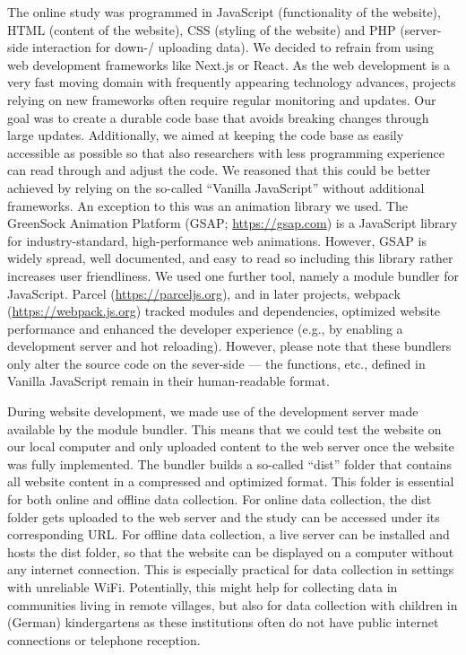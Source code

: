 \documentclass[
]{scrbook}
\begin{document}
The online study was programmed in JavaScript (functionality of the website), HTML (content of the website), CSS (styling of the website) and PHP (server-side interaction for down-/ uploading data). We decided to refrain from using web development frameworks like Next.js or React. As the web development is a very fast moving domain with frequently appearing technology advances, projects relying on new frameworks often require regular monitoring and updates. Our goal was to create a durable code base that avoids breaking changes through large updates. Additionally, we aimed at keeping the code base as easily accessible as possible so that also researchers with less programming experience can read through and adjust the code. We reasoned that this could be better achieved by relying on the so-called ``Vanilla JavaScript'' without additional frameworks. An exception to this was an animation library we used. The GreenSock Animation Platform (GSAP; \url{https://gsap.com}) is a JavaScript library for industry-standard, high-performance web animations. However, GSAP is widely spread, well documented, and easy to read so including this library rather increases user friendliness. We used one further tool, namely a module bundler for JavaScript. Parcel (\url{https://parceljs.org}), and in later projects, webpack (\url{https://webpack.js.org}) tracked modules and dependencies, optimized website performance and enhanced the developer experience (e.g., by enabling a development server and hot reloading). However, please note that these bundlers only alter the source code on the sever-side --- the functions, etc., defined in Vanilla JavaScript remain in their human-readable format.

During website development, we made use of the development server made available by the module bundler. This means that we could test the website on our local computer and only uploaded content to the web server once the website was fully implemented. The bundler builds a so-called ``dist'' folder that contains all website content in a compressed and optimized format. This folder is essential for both online and offline data collection. For online data collection, the dist folder gets uploaded to the web server and the study can be accessed under its corresponding URL. For offline data collection, a live server can be installed and hosts the dist folder, so that the website can be displayed on a computer without any internet connection. This is especially practical for data collection in settings with unreliable WiFi. Potentially, this might help for collecting data in communities living in remote villages, but also for data collection with children in (German) kindergartens as these institutions often do not have public internet connections or telephone reception.
\end{document}
